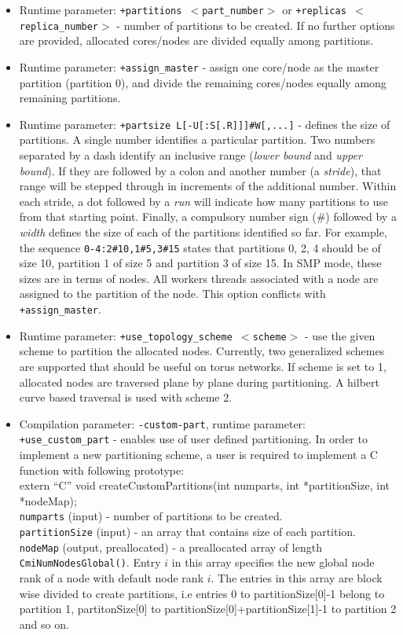 \begin{itemize}
\item Runtime parameter: {\tt +partitions $<$part\_number$>$} or {\tt +replicas
$<$replica\_number$>$} - number of partitions to be created. If no further options are
provided, allocated cores/nodes are divided equally among partitions.

\item Runtime parameter: {\tt +assign\_master} - assign one core/node as the master 
partition (partition 0), and divide the remaining cores/nodes equally among remaining
partitions.

\item Runtime parameter: {\tt +partsize L[-U[:S[.R]]]\#W[,...]} - defines the size of 
partitions.  A single number identifies a particular partition. Two numbers separated by
a dash identify an inclusive range (\emph{lower bound} and \emph{upper bound}). If they 
are followed by a colon and another number (a \emph{stride}), that range will be stepped 
through in increments of the additional number. Within each stride, a dot followed by a
\emph{run} will indicate how many partitions to use from that starting point.  Finally, 
a compulsory number sign (\#) followed by a \emph{width} defines the size of each of the
partitions identified so far. For example, the sequence {\tt 0-4:2\#10,1\#5,3\#15} states that 
partitions 0, 2, 4 should be of size 10, partition 1 of size 5 and partition 3 of size 15. 
In SMP mode, these sizes are in terms of nodes. All workers threads associated with a node are
assigned to the partition of the node. This option conflicts with {\tt +assign\_master}.

\item Runtime parameter: {\tt +use\_topology\_scheme $<$scheme$>$} - use the given scheme
to partition the allocated nodes. Currently, two generalized schemes are supported that 
should be useful on torus networks. If scheme is set to 1, allocated nodes are traversed 
plane by plane during partitioning. A hilbert curve based traversal is used with scheme 2.

\item Compilation parameter: {\tt -custom-part}, runtime parameter: {\tt +use\_custom\_part} -
enables use of user defined partitioning. In order to implement a new partitioning scheme, 
a user is required to implement a C function with following prototype: \\ 

extern ``C'' void createCustomPartitions(int numparts, int *partitionSize, int *nodeMap);\\
{\tt numparts} (input) - number of partitions to be created. \\
{\tt partitionSize} (input) - an array that contains size of each partition. \\
{\tt nodeMap} (output, preallocated) - a preallocated array of length {\tt CmiNumNodesGlobal()}.
Entry $i$ in this array specifies the new global node rank of a node with default node rank $i$. 
The entries in this array are block wise divided to create partitions, i.e entries 0 to 
partitionSize[0]-1 belong to partition 1, partitonSize[0] to
partitionSize[0]+partitionSize[1]-1 to partition 2 and so on.\\


\end{itemize}
